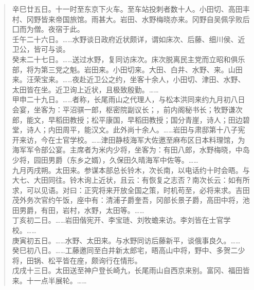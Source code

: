\begin{quote}
辛巳廿五日。十一时至东京下火车。至车站投刺者数十人。小田切、高田丰村、冈野皆来帝国旅馆。雨甚大。岩田、水野梅晓亦来。冈野自吴佩孚败后囗而为僧。夜宿于此。\\

壬午二十六日。……水野谈日政府近状颇详，谓如床次、后藤、细川侯、近卫公，皆可与谈。\\

癸未二十七日。……送过水野，复同访床次。床次脱离民主党而立昭和俱乐部，将为第三党之魁。岩田来。小田切来。大田、白井、水野、来。山田来。汪荣宝来。……夜赴近卫公之约，坐客十余人，小田切、津田、水野、太田皆在坐。近卫询上近状，且极致殷勤。……\\

甲申二十九日。……者称，长尾雨山之代理人，与松本洪同来约九月初八日会宴，坐客为：平沼骐一郎，枢密院副议长；，前内阁秘书长；牧野谦次郎，能文，早稻田教授；松平康国，早稻田教授；国分青崖，诗人；田边碧堂，诗人；内田周平，能汉文。此外尚十余人。……岩田与肃邸第十八子宪开来访，今在士官学校。……津田静枝海军大佐邀至麻布区日本料理馆，为海军军令部公宴。主席者为米内少将，坐客为：有田八郎，水野梅晓，中岛少将，园田男爵（东乡之婿），久保田久晴海军中佐等。……\\

九月丙戌朔。太田来。参谋本部总长铃木，次长南，以电话约十时会晤。与大七、大田同往。铃木询上近状，且云：有恢复之志否？南次长云：如有所求，可以见语。对曰：正究将来开放全国之策，时机苟至，必将来求。吉田茂外务次官约午饭，座中有：清浦子爵奎吾，冈部长景子爵，高田中将，池田男爵，有田，岩村，水野，太田等。……\\

丁亥初二日。……岩田偕宪开、李宝琏、刘牧蟾来访。李刘皆在士官学校。……\\

庚寅初五日。……水野、太田来。与水野同访后藤新平，谈俄事良久。……\\

癸巳初八日。……工藤邀同至白井新太郎宅，晤高山中将，野中、多贺二少将，田锅、松平皆在座，颇询行在情形。\\

戊戌十三日。太田送至神户登长崎九，长尾雨山自西京来别。富冈、福田皆来。十一点半展轮。……\\
\end{quote}

